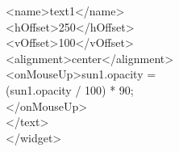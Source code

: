 \begin{minipage}{0.5\textwidth}
{\hspace*{4mm}<name>text1</name>\\
\hspace*{4mm}<hOffset>250</hOffset>\\
\hspace*{4mm}<vOffset>100</vOffset>\\
\hspace*{4mm}<alignment>center</alignment>\\
\hspace*{4mm}<onMouseUp>sun1.opacity =\\
\hspace*{6mm}(sun1.opacity / 100) * 90;\\
\hspace*{4mm}</onMouseUp>\\
\hspace*{2mm}</text>\\
</widget>}
\end{minipage}
